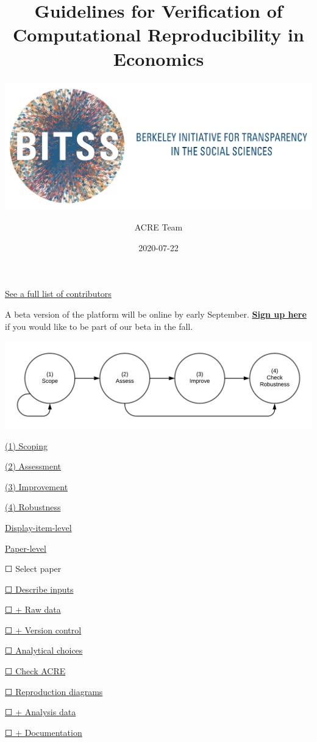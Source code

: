 \documentclass[]{book}
\title{Guidelines for Verification of Computational Reproducibility in Economics}
\subtitle{\href{https://www.bitss.org/}{\includegraphics{BITSS_logo_horizontal.png}}\\}
\author{ACRE Team}
\date{2020-07-22}
\begin{document}
\maketitle

{
\setcounter{tocdepth}{1}
\tableofcontents
}
\hypertarget{section}{%
\chapter*{}\label{section}}

\protect\hyperlink{contributions}{See a full list of contributors}

A beta version of the platform will be online by early September.
\href{https://forms.gle/yZivWcwijCzEhrBU6}{\textbf{Sign up here}} if you would like to be part of our beta in the fall.

\includegraphics[width=1\linewidth]{stages}

\protect\hyperlink{scoping}{(1) Scoping}

\protect\hyperlink{assessment}{(2) Assessment}

\protect\hyperlink{improvements}{(3) Improvement}

\protect\hyperlink{robust}{(4) Robustness}

\protect\hyperlink{di-imp}{Display-item-level}

\protect\hyperlink{paper-level}{Paper-level}

☐ Select paper

\protect\hyperlink{describe-inputs}{☐ Describe inputs}

\protect\hyperlink{rd}{☐ + Raw data}

\protect\hyperlink{paper-level}{☐ + Version control}

\protect\hyperlink{id-analy}{☐ Analytical choices}

\protect\hyperlink{check-acre}{☐ Check ACRE}

\protect\hyperlink{diagram}{☐ Reproduction diagrams}

\protect\hyperlink{ad}{☐ + Analysis data}

\protect\hyperlink{paper-level}{☐ + Documentation}
\end{document}
